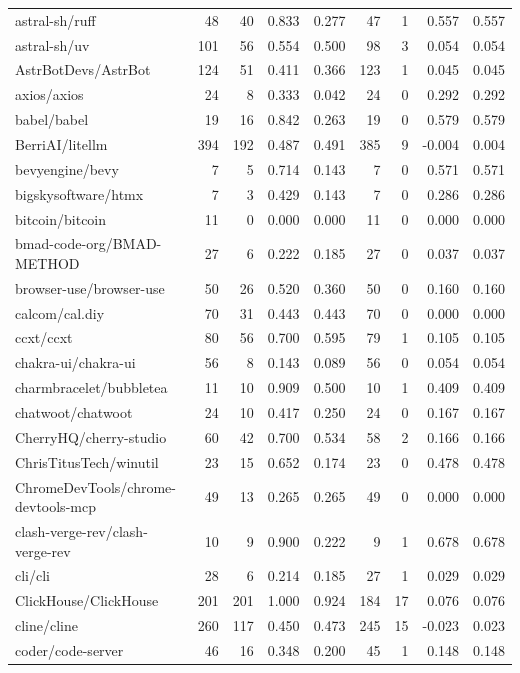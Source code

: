 \begin{tabular}{lrrrrrrrr}
astral-sh/ruff & 48 & 40 & 0.833 & 0.277 & 47 & 1 & 0.557 & 0.557 \\
astral-sh/uv & 101 & 56 & 0.554 & 0.500 & 98 & 3 & 0.054 & 0.054 \\
AstrBotDevs/AstrBot & 124 & 51 & 0.411 & 0.366 & 123 & 1 & 0.045 & 0.045 \\
axios/axios & 24 & 8 & 0.333 & 0.042 & 24 & 0 & 0.292 & 0.292 \\
babel/babel & 19 & 16 & 0.842 & 0.263 & 19 & 0 & 0.579 & 0.579 \\
BerriAI/litellm & 394 & 192 & 0.487 & 0.491 & 385 & 9 & -0.004 & 0.004 \\
bevyengine/bevy & 7 & 5 & 0.714 & 0.143 & 7 & 0 & 0.571 & 0.571 \\
bigskysoftware/htmx & 7 & 3 & 0.429 & 0.143 & 7 & 0 & 0.286 & 0.286 \\
bitcoin/bitcoin & 11 & 0 & 0.000 & 0.000 & 11 & 0 & 0.000 & 0.000 \\
bmad-code-org/BMAD-METHOD & 27 & 6 & 0.222 & 0.185 & 27 & 0 & 0.037 & 0.037 \\
browser-use/browser-use & 50 & 26 & 0.520 & 0.360 & 50 & 0 & 0.160 & 0.160 \\
calcom/cal.diy & 70 & 31 & 0.443 & 0.443 & 70 & 0 & 0.000 & 0.000 \\
ccxt/ccxt & 80 & 56 & 0.700 & 0.595 & 79 & 1 & 0.105 & 0.105 \\
chakra-ui/chakra-ui & 56 & 8 & 0.143 & 0.089 & 56 & 0 & 0.054 & 0.054 \\
charmbracelet/bubbletea & 11 & 10 & 0.909 & 0.500 & 10 & 1 & 0.409 & 0.409 \\
chatwoot/chatwoot & 24 & 10 & 0.417 & 0.250 & 24 & 0 & 0.167 & 0.167 \\
CherryHQ/cherry-studio & 60 & 42 & 0.700 & 0.534 & 58 & 2 & 0.166 & 0.166 \\
ChrisTitusTech/winutil & 23 & 15 & 0.652 & 0.174 & 23 & 0 & 0.478 & 0.478 \\
ChromeDevTools/chrome-devtools-mcp & 49 & 13 & 0.265 & 0.265 & 49 & 0 & 0.000 & 0.000 \\
clash-verge-rev/clash-verge-rev & 10 & 9 & 0.900 & 0.222 & 9 & 1 & 0.678 & 0.678 \\
cli/cli & 28 & 6 & 0.214 & 0.185 & 27 & 1 & 0.029 & 0.029 \\
ClickHouse/ClickHouse & 201 & 201 & 1.000 & 0.924 & 184 & 17 & 0.076 & 0.076 \\
cline/cline & 260 & 117 & 0.450 & 0.473 & 245 & 15 & -0.023 & 0.023 \\
coder/code-server & 46 & 16 & 0.348 & 0.200 & 45 & 1 & 0.148 & 0.148 \\

\end{tabular}

